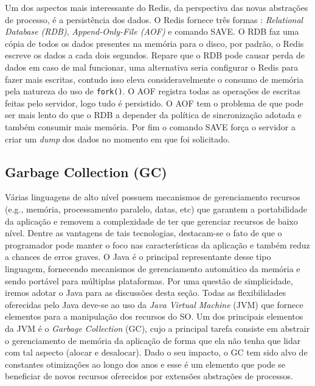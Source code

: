 Um dos aspectos mais interessante do Redis, da perspectiva das novas abstrações
de processo, é a persistência dos dados. O Redis fornece três formas
\citep{redisio}: \textit{Relational Database (RDB)}, \textit{Append-Only-File
(AOF)} e comando SAVE. O RDB faz uma cópia de todos os dados presentes na
memória para o disco, por padrão, o Redis escreve os dados a cada dois
segundos. Repare que o RDB pode causar perda de dados em caso de mal funcionar,
uma alternativa seria configurar o Redis para fazer mais escritas, contudo isso
eleva consideravelmente o consumo de memória pela natureza do uso de
\texttt{fork()}. O AOF registra todas as operações de escritas feitas pelo
servidor, logo tudo é persistido. O AOF tem o problema de que pode ser mais
lento do que o RDB a depender da política de sincronização adotada e também
consumir mais memória.  Por fim o comando SAVE força o servidor a criar um
\textit{dump} dos dados no momento em que foi solicitado.


\subsection{Garbage Collection (GC)}
\label{sec:gc}

Várias linguagens de alto nível possuem mecanismos de gerenciamento recursos
(e.g., memória, processamento paralelo, datas, etc) que garantem a portabilidade
da aplicação e removem a complexidade de ter que gerenciar recursos de baixo
nível. Dentre as vantagens de tais tecnologias, destacam-se o fato de que o
programador pode manter o foco nas características da aplicação e também reduz
a chances de erros graves. O Java é o principal representante desse tipo
linguagem, fornecendo mecanismos de gerenciamento automático da memória e sendo
portável para múltiplas plataformas. Por uma questão de simplicidade, iremos
adotar o Java para as discussões desta seção. Todas as flexibilidades
oferecidas pelo Java deve-se ao uso da \textit{Java Virtual Machine} (JVM) que
fornece elementos para a manipulação dos recursos do SO. Um dos principais
elementos da JVM é o \textit{Garbage Collection} (GC), cujo a principal tarefa
consiste em abstrair o gerenciamento de memória da aplicação de forma que ela
não tenha que lidar com tal aspecto (alocar e desalocar). Dado o seu impacto, o
GC tem sido alvo de constantes otimizações ao longo dos anos e esse é um
elemento que pode se beneficiar de novos recursos oferecidos por extensões
abstrações de processos.

